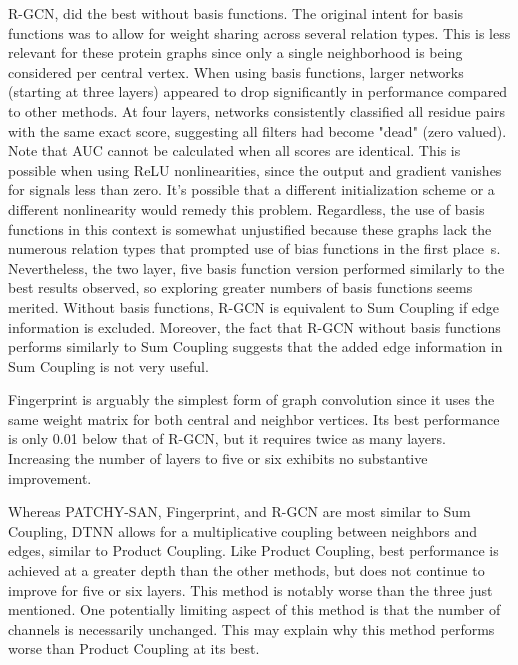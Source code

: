R-GCN, did the best without basis functions.
The original intent for basis functions was to allow for weight sharing across several relation types.
This is less relevant for these protein graphs since only a single neighborhood is being considered per central vertex. 
When using basis functions, larger networks (starting at three layers) appeared to drop significantly in performance compared to other methods.
At four layers, networks consistently classified all residue pairs with the same exact score, suggesting all filters had become "dead" (zero valued).
Note that AUC cannot be calculated when all scores are identical.
This is possible when using ReLU nonlinearities, since the output and gradient vanishes for signals less than zero.
It's possible that a different initialization scheme or a different nonlinearity would remedy this problem.
Regardless, the use of basis functions in this context is somewhat unjustified because these graphs lack the numerous relation types that prompted use of bias functions in the first place~s\cite{schlichtkrull2017}.
Nevertheless, the two layer, five basis function version performed similarly to the best results observed, so exploring greater numbers of basis functions seems merited.
Without basis functions, R-GCN is equivalent to Sum Coupling if edge information is excluded.
Moreover, the fact that R-GCN without basis functions performs similarly to Sum Coupling suggests that the added edge information in Sum Coupling is not very useful.

Fingerprint is arguably the simplest form of graph convolution since it uses the same weight matrix for both central and neighbor vertices.
Its best performance is only 0.01 below that of R-GCN, but it requires twice as many layers.
Increasing the number of layers to five or six exhibits no substantive improvement. 

Whereas PATCHY-SAN, Fingerprint, and R-GCN are most similar to Sum Coupling, DTNN allows for a multiplicative coupling between neighbors and edges, similar to Product Coupling.
Like Product Coupling, best performance is achieved at a greater depth than the other methods, but does not continue to improve for five or six layers. 
This method is notably worse than the three just mentioned.
One potentially limiting aspect of this method is that the number of channels is necessarily unchanged.
This may explain why this method performs worse than Product Coupling at its best.


